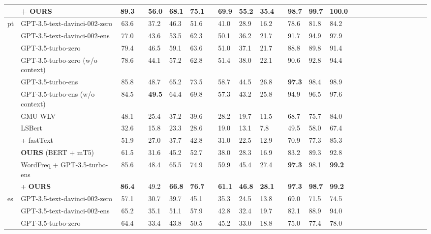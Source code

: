 \documentclass[11pt]{article}
\begin{document}
\begin{table*}[t!]
\begin{center}
\begin{adjustbox}{max width=\textwidth}
\begin{tabular}{llclllllllllllllllllllllll}
& + \textbf{OURS}
&\textbf{89.3}&&\textbf{56.0}&\textbf{68.1}&\textbf{75.1}&&\textbf{69.9}&\textbf{55.2}&\textbf{35.4}&&\textbf{98.7}&\textbf{99.7}&\textbf{100.0}\\

\midrule\midrule

\multirow{12}{*}{pt}&GPT-3.5-text-davinci-002-zero
&63.6&&37.2&46.3&51.6&&41.0&28.9&16.2&&78.6&81.8&84.2\\
&GPT-3.5-text-davinci-002-ens
&77.0&&43.6&53.5&62.3&&50.1&36.2&21.7&&91.7&94.9&97.9\\


&GPT-3.5-turbo-zero
&79.4&&46.5&59.1&63.6&&51.0&37.1&21.7&&88.8&89.8&91.4
\\

&GPT-3.5-turbo-zero (w/o context)
&78.6&&44.1&57.2&62.8&&51.4&38.0&22.1&&90.6&92.8&94.4\\

& GPT-3.5-turbo-ens
&85.8&&48.7&65.2&73.5&&58.7&44.5&26.8&&\textbf{97.3}&98.4&98.9
\\

&GPT-3.5-turbo-ens (w/o context)
&84.5&&\textbf{49.5}&64.4&69.8&&57.3&43.2&25.8&&94.9&96.5&97.6\\

&GMU-WLV
&48.1&&25.4&37.2&39.6&&28.2&19.7&11.5&&68.7&75.7&84.0\\
&LSBert 
&32.6&&15.8&23.3&28.6&&19.0&13.1&7.8&&49.5&58.0&67.4\\
&\citet{wada-etal-2022-unsupervised} + fastText
&51.9&&27.0&37.7&42.8&&31.0&22.5&12.9&&70.9&77.3&85.3\\
&\textbf{OURS} (BERT + mT5)
&61.5&&31.6&45.2&52.7&&38.0&28.3&16.9&&83.2&89.3&92.8
\\\midrule
&WordFreq + GPT-3.5-turbo-ens
&85.6&&48.4&65.5&74.9&&59.9&45.4&27.4&&\textbf{97.3}&98.1&\textbf{99.2}\\


& + \textbf{OURS}
&\textbf{86.4}&&49.2&\textbf{66.8}&\textbf{76.7}&&\textbf{61.1}&\textbf{46.8}&\textbf{28.1}&&\textbf{97.3}&\textbf{98.7}&\textbf{99.2}\\


\midrule\midrule
\multirow{12}{*}{es}&GPT-3.5-text-davinci-002-zero
&57.1&&30.7&39.7&45.1&&35.3&24.5&13.8&&69.0&71.5&74.5
\\
&GPT-3.5-text-davinci-002-ens
&65.2&&35.1&51.1&57.9&&42.8&32.4&19.7&&82.1&88.9&94.0\\
&GPT-3.5-turbo-zero
&64.4&&33.4&43.8&50.5&&45.2&33.0&18.8&&75.0&77.4&78.0
\\


\end{tabular}
\end{adjustbox}
\end{center}
\end{table*}
\end{document}
